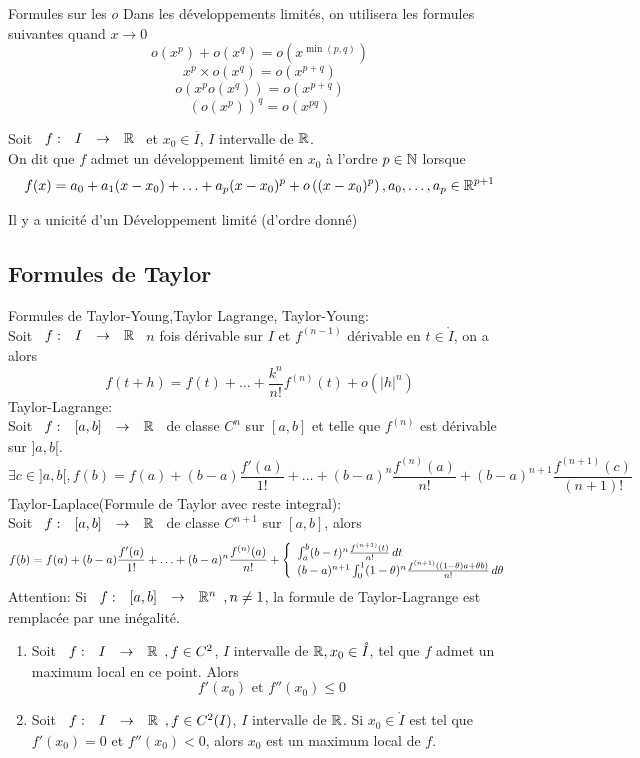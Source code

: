\documentclass[]{report}
\begin{document}
\begin{prop}{Formules sur les $o$}{}
    Dans les développements limités, on utilisera les formules suivantes quand $x\to 0$
    \[o(x^p)+o(x^q)=o(x^{\min(p,q)})\]
    \[x^p \times o(x^q)=o(x^{p+q})\]
    \[o(x^p o(x^q))=o(x^{p+q})\]
    \[\left( o(x^p)\right)^q= o(x^{pq})\]
\end{prop}

\begin{df}{}{}
    Soit $\begin{array}{ccccc} f : & I & \to & \mathbb{R} \end{array}$ et $x_0\in \overline{I}$, $I$ intervalle de $\mathbb{R}$.\\
    On dit que $f$ admet un développement limité en $x_0$ à l'ordre $p\in \mathbb{N}$ lorsque
    \[f(x)=a_0+a_1(x-x_0)+\ldots+ a_p (x-x_0)^p +o\left((x-x_0)^p\right),a_0,\ldots,a_p\in \mathbb{R}^{p+1}\]
\end{df}

\begin{re}{}{}
    Il y a unicité d'un Développement limité (d'ordre donné)
\end{re}

\subsection*{Formules de Taylor}

\begin{df}{Formules de Taylor-Young,Taylor Lagrange,}{}
    Taylor-Young:\\
    Soit $\begin{array}{ccccc} f : & I & \to & \mathbb{R} \end{array}$ $n$ fois dérivable sur $I$ et $f^{(n-1)}$ dérivable en $t\in \mathring{I}$, on a alors
    \[f(t+h)=f(t)+\ldots+\frac{k^n}{n!}f^{(n)}(t)+ o(|h|^n)\]
    Taylor-Lagrange:\\
    Soit $\begin{array}{ccccc} f : & [a,b] & \to & \mathbb{R} \end{array}$ de classe $C^n$ sur $[a,b]$ et telle que $f^{(n)}$ est dérivable sur $]a,b[$.
    \[\exists c\in ]a,b[, f(b)=f(a)+(b-a)\frac{f'(a)}{1!}+\ldots+ (b-a)^n\frac{f^{(n)}(a)}{n!}+ (b-a)^{n+1}\frac{f^{(n+1)}(c)}{(n+1)!}\]
    Taylor-Laplace(Formule de Taylor avec reste integral):\\
    Soit $\begin{array}{ccccc} f : & [a,b] & \to & \mathbb{R} \end{array}$ de classe $C^{n+1}$ sur $[a,b]$, alors
    \[f(b)=f(a)+(b-a)\frac{f'(a)}{1!}+\ldots+ (b-a)^n \frac{f^{(n)}(a)}{n!}+\left\{\begin{array}{ll} \int_a^b (b-t)^n \frac{f^{(n+1)}(t)}{n!}\, dt\\ (b-a)^{n+1} \int_{0}^{1}(1-\theta)^n\frac{f^{(n+1)} \left((1-\theta)a+\theta b\right)}{n!} \, d\theta \end{array} \right.\]
    Attention: Si $\begin{array}{ccccc} f : & [a,b] & \to & \mathbb{R}^n \end{array},n\neq 1$, la formule de Taylor-Lagrange est remplacée par une inégalité.
\end{df}

\begin{prop}{}{}
    \begin{enumerate}
        \item Soit $\begin{array}{ccccc} f : & I & \to & \mathbb{R} \end{array}, f\in C^2$, $I$ intervalle de $\mathbb{R},x_0\in \mathring{I}$, tel que $f$ admet un maximum local en ce point. Alors
              \[f'(x_0)\text{ et }f''(x_0)\le 0\]
        \item Soit $\begin{array}{ccccc} f : & I & \to & \mathbb{R} \end{array},f\in C^2(I)$, $I$ intervalle de $\mathbb{R}$. Si $x_0\in \mathring{I}$ est tel que $f'(x_0)=0$ et $f''(x_0)<0$, alors $x_0$ est un maximum local de $f$.
    \end{enumerate}
\end{prop}
\end{document}
